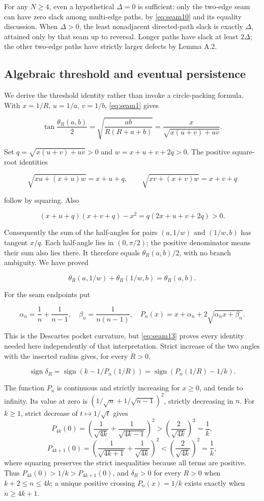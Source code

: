 For any $N\ge4$, even a hypothetical $\Delta=0$ is sufficient:
only the two-edge seam can have zero slack among multi-edge paths, by \eqref{eq:seam10}
and its equality discussion. When $\Delta>0$, the least nonadjacent
directed-path slack is exactly $\Delta$, attained only by that seam
up to reversal. Longer paths have slack at least $2\Delta$; the other
two-edge paths have strictly larger defects by Lemma A.2.

\subsection{Algebraic threshold and eventual persistence}

We derive the threshold identity rather than invoke a circle-packing
formula. With $x=1/R$, $u=1/a$, $v=1/b$, \eqref{eq:seam1} gives

\[
 \tan\frac{\theta_R(a,b)}2
 =\sqrt{\frac{ab}{R(R+a+b)}}=\frac{x}{\sqrt{x(u+v)+uv}}.
 \tag{A.12}\label{eq:seam12}
\]

Set $q=\sqrt{x(u+v)+uv}>0$ and $w=x+u+v+2q>0$. The positive
square-root identities

\[
 \sqrt{xu+(x+u)w}=x+u+q,\qquad
 \sqrt{xv+(x+v)w}=x+v+q
\]

follow by squaring. Also

\[
 (x+u+q)(x+v+q)-x^2=q(2x+u+v+2q)>0.
\]

Consequently the sum of the half-angles for pairs $(a,1/w)$ and
$(1/w,b)$ has tangent $x/q$. Each half-angle lies in
$(0,\pi/2)$; the positive denominator means their sum also lies
there. It therefore equals $\theta_R(a,b)/2$, with no branch
ambiguity. We have proved

\[
 \theta_R(a,1/w)+\theta_R(1/w,b)=\theta_R(a,b).
 \tag{A.13}\label{eq:seam13}
\]

For the seam endpoints put

\[
 \alpha_n=\frac1n+\frac1{n-1},\quad \beta_n=\frac1{n(n-1)},\quad
 P_n(x)=x+\alpha_n+2\sqrt{\alpha_n x+\beta_n}.
 \tag{A.14}\label{eq:seam14}
\]

This is the Descartes pocket curvature, but \eqref{eq:seam13} proves every identity
needed here independently of that interpretation. Strict increase of the
two angles with the inserted radius gives, for every $R>0$,

\[
 \operatorname{sign}\delta_R
 =\operatorname{sign}(k-1/P_n(1/R))
 =\operatorname{sign}(P_n(1/R)-1/k). \tag{A.15}\label{eq:seam15}
\]

The function $P_n$ is continuous and strictly increasing for $x\ge0$,
and tends to infinity. Its value at zero is
$(1/\sqrt n+1/\sqrt{n-1})^2$, strictly decreasing in $n$.
For $k\ge1$, strict decrease of $t\mapsto1/\sqrt t$ gives
\[
 P_{4k}(0)=\left(\frac1{\sqrt{4k}}+\frac1{\sqrt{4k-1}}\right)^2
 >\left(\frac2{\sqrt{4k}}\right)^2=\frac1k,
\]
\[
 P_{4k+1}(0)=\left(\frac1{\sqrt{4k+1}}+\frac1{\sqrt{4k}}\right)^2
 <\left(\frac2{\sqrt{4k}}\right)^2=\frac1k,
\]
where squaring preserves the strict inequalities because all terms are
positive. Thus $P_{4k}(0)>1/k>P_{4k+1}(0)$, and $\delta_R>0$ for every
$R>0$ when $k+2\le n\le4k$; a unique positive crossing
$P_n(x)=1/k$ exists exactly when $n\ge4k+1$.

